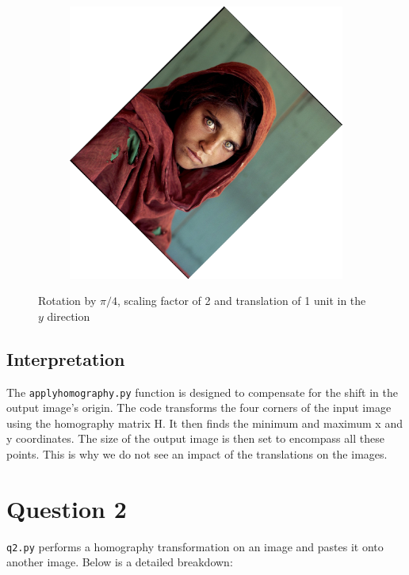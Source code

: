 \documentclass{article}
\begin{document}
\begin{figure}[H]
\begin{subfigure}{.3\textwidth}
    \end{subfigure}
    \begin{subfigure}{.3\textwidth}
        \centering
        \includegraphics[scale=0.04]{q1/output/similar_2_2_2.jpg}
    \end{subfigure}
    \caption{Rotation by \(\pi/4\), scaling factor of 2 and translation of 1 unit in the \(y\) direction}
\end{figure}

\subsection{Interpretation}
The \texttt{applyhomography.py} function is designed to compensate for the shift in the output image's origin. The code transforms the four corners of the input image using the homography matrix H. 
It then finds the minimum and maximum x and y coordinates. The size of the output image is then set to encompass all these points. 
This is why we do not see an impact of the translations on the images. 

\section{Question 2}
\texttt{q2.py} performs a homography transformation on an image and pastes it onto another image. Below is a detailed breakdown:
\end{document}
